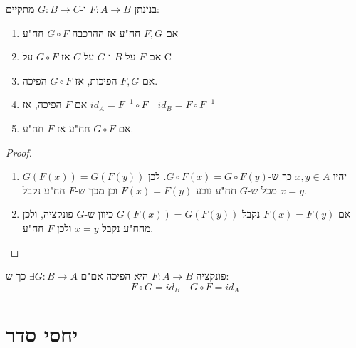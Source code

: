 \documentclass{tstextbook}
\begin{document}
\begin{proposition}
בנינתן \(F:A\to B\) ו-\(G:B\to C\) מתקיים:

  \begin{enumerate}
    \item אם \(F,G\) חח"ע אז ההרכבה \(G\circ F\) חח"ע 


    \item אם \(F\) על \(B\) ו-\(G\) על \(C\) אז \(G\circ F\) על C 


    \item אם \(F,G\) הפיכות, אז \(G\circ F\) הפיכה. 


    \item אם \(F\) הפיכה, אז \(id_{A}=F^{-1}\circ F\quad id_{B}=F\circ F^{-1}\)


    \item אם \(G \circ F\) חח"ע אז \(F\) חח"ע. 


  \end{enumerate}
\end{proposition}
\begin{proof}
  \begin{enumerate}
    \item יהיו \(x,y \in A\) כך ש-\(G \circ F(x)=G \circ F(y)\). לכן \(G(F(x))=G(F(y))\) מכל ש-\(G\) חח"ע נובע \(F(x)=F(y)\) וכן מכך ש-\(F\) חח"ע נקבל \(x=y\). 


    \item אם \(F(x)=F(y)\) נקבל \(G(F(x))=G(F(y))\) כיוון ש-\(G\) פונקציה, ולכן מחח"ע נקבל \(x=y\) ולכן \(F\) חח"ע. 


  \end{enumerate}
\end{proof}
\begin{proposition}
פונקציה \(F:A\to B\) היא הפיכה אם"ם \(\exists G:B\to A\) כך ש:
$$F\circ G = id_{B}\quad G\circ  F = id_{A}$$

\end{proposition}
\section{יחסי סדר}
\end{document}
